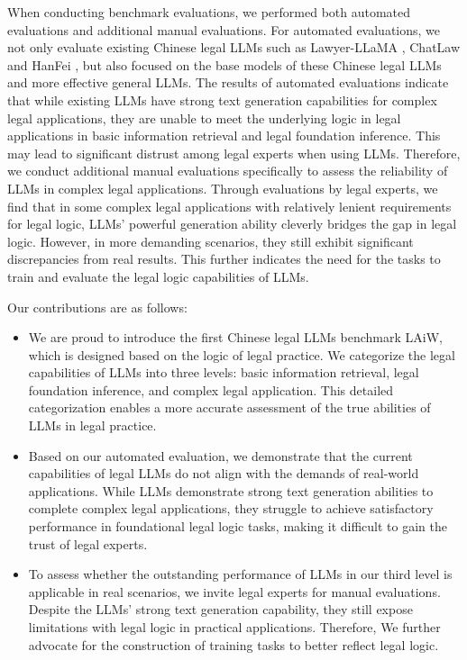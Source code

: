 When conducting benchmark evaluations, we performed both automated evaluations and additional manual evaluations. For automated evaluations, we not only evaluate existing Chinese legal LLMs such as Lawyer-LLaMA \cite{lawyer-llama-report}, ChatLaw\cite{cui2023chatlaw} and HanFei \cite{HanFei}, but also focused on the base models of these Chinese legal LLMs and more effective general LLMs. 
The results of automated evaluations indicate that while existing LLMs have strong text generation capabilities for complex legal applications, they are unable to meet the underlying logic in legal applications in basic information retrieval and legal foundation inference. 
This may lead to significant distrust among legal experts when using LLMs. 
Therefore, we conduct additional manual evaluations specifically to assess the reliability of LLMs in complex legal applications. 
Through evaluations by legal experts, we find that in some complex legal applications with relatively lenient requirements for legal logic, LLMs' powerful generation ability cleverly bridges the gap in legal logic. 
However, in more demanding scenarios, they still exhibit significant discrepancies from real results. 
This further indicates the need for the tasks to train and evaluate the legal logic capabilities of LLMs.

Our contributions are as follows:
\begin{itemize}
    \item 
    We are proud to introduce the first Chinese legal LLMs benchmark LAiW, which is designed based on the logic of legal practice. We categorize the legal capabilities of LLMs into three levels: basic information retrieval, legal foundation inference, and complex legal application. This detailed categorization enables a more accurate assessment of the true abilities of LLMs in legal practice.
    \item Based on our automated evaluation, we demonstrate that the current capabilities of legal LLMs do not align with the demands of real-world applications. While LLMs demonstrate strong text generation abilities to complete complex legal applications, they struggle to achieve satisfactory performance in foundational legal logic tasks, making it difficult to gain the trust of legal experts.
    \item To assess whether the outstanding performance of LLMs in our third level is applicable in real scenarios, we invite legal experts for manual evaluations. Despite the LLMs' strong text generation capability, they still expose limitations with legal logic in practical applications. Therefore, We further advocate for the construction of training tasks to better reflect legal logic.
\end{itemize}

